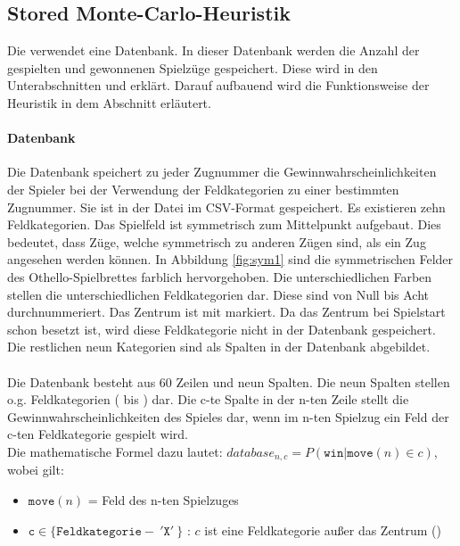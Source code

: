 \subsection{Stored Monte-Carlo-Heuristik}
Die  verwendet eine Datenbank. In dieser Datenbank werden die Anzahl der gespielten und gewonnenen Spielzüge gespeichert. Diese wird in den Unterabschnitten  und  erklärt. Darauf aufbauend wird die Funktionsweise der Heuristik in dem Abschnitt  erläutert.
\paragraph{Datenbank}
\label{para:db}
Die Datenbank speichert zu jeder Zugnummer die Gewinnwahrscheinlichkeiten der Spieler bei der Verwendung der Feldkategorien zu einer bestimmten Zugnummer. Sie ist in der Datei  im CSV-Format gespeichert. Es existieren zehn Feldkategorien. 
Das Spielfeld ist symmetrisch zum Mittelpunkt aufgebaut. Dies bedeutet, dass Züge, welche symmetrisch zu anderen Zügen sind, als ein Zug angesehen werden können. In Abbildung \ref{fig:sym1} sind die symmetrischen Felder des Othello-Spielbrettes farblich hervorgehoben. Die unterschiedlichen Farben stellen die unterschiedlichen Feldkategorien dar. Diese sind von Null bis Acht durchnummeriert. Das Zentrum ist mit  markiert. Da das Zentrum bei Spielstart schon besetzt ist, wird diese Feldkategorie nicht in der Datenbank gespeichert. Die restlichen neun Kategorien sind als Spalten in der Datenbank abgebildet.
\\
\\Die Datenbank besteht aus 60 Zeilen und neun Spalten. Die neun Spalten stellen o.g. Feldkategorien (  bis ) dar. Die c-te Spalte in der n-ten Zeile stellt die Gewinnwahrscheinlichkeiten des Spieles dar, wenn im n-ten Spielzug ein Feld der c-ten Feldkategorie gespielt wird. 
\\Die mathematische Formel dazu lautet:
$database_{n,c} = P( \mathtt{win} | \mathtt{move}(n) \in c)$, wobei gilt:
\begin{itemize}
\item $\mathtt{move}(n)$ = Feld des n-ten Spielzuges
\item $\mathtt{c} \in \{\mathtt{Feldkategorie} -\ '\mathtt{X}'\ \}$ : $c$ ist eine Feldkategorie außer das Zentrum ()
\end{itemize}

